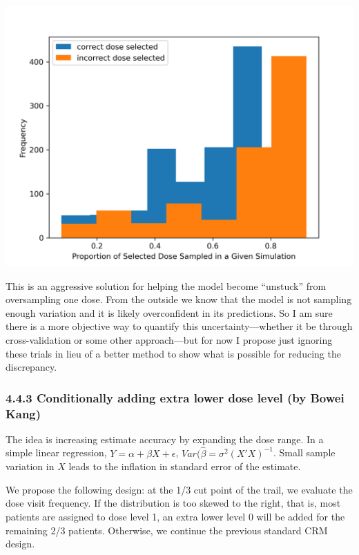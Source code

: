 \documentclass[
]{article}
\begin{document}
\includegraphics{gabe_sim_files/gabe_sim_fig.png}

This is an aggressive solution for helping the model become ``unstuck''
from oversampling one dose. From the outside we know that the model is
not sampling enough variation and it is likely overconfident in its
predictions. So I am sure there is a more objective way to quantify this
uncertainty---whether it be through cross-validation or some other
approach---but for now I propose just ignoring these trials in lieu of a
better method to show what is possible for reducing the discrepancy.

\hypertarget{conditionally-adding-extra-lower-dose-level-by-bowei-kang}{%
\subsubsection{4.4.3 Conditionally adding extra lower dose level (by
Bowei
Kang)}\label{conditionally-adding-extra-lower-dose-level-by-bowei-kang}}

The idea is increasing estimate accuracy by expanding the dose range. In
a simple linear regression, \(Y = \alpha + \beta X + \epsilon\),
\(Var(\hat{\beta} = \sigma^2 (X'X)^{-1}\). Small sample variation in
\(X\) leads to the inflation in standard error of the estimate.

We propose the following design: at the 1/3 cut point of the trail, we
evaluate the dose visit frequency. If the distribution is too skewed to
the right, that is, most patients are assigned to dose level 1, an extra
lower level 0 will be added for the remaining 2/3 patients. Otherwise,
we continue the previous standard CRM design.
\end{document}
